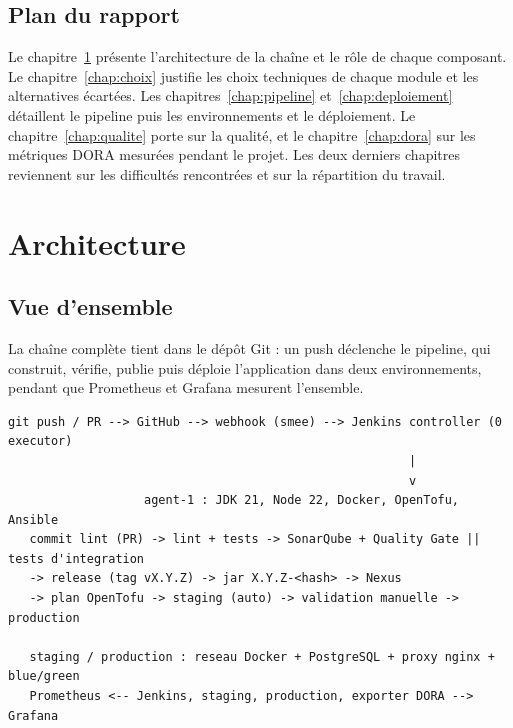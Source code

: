 \documentclass[11pt,a4paper]{report}
\begin{document}
\section*{Plan du rapport}
Le chapitre~\ref{chap:architecture} présente l'architecture de la chaîne et le rôle de chaque composant. Le chapitre~\ref{chap:choix} justifie les choix techniques de chaque module et les alternatives écartées. Les chapitres~\ref{chap:pipeline} et~\ref{chap:deploiement} détaillent le pipeline puis les environnements et le déploiement. Le chapitre~\ref{chap:qualite} porte sur la qualité, et le chapitre~\ref{chap:dora} sur les métriques DORA mesurées pendant le projet. Les deux derniers chapitres reviennent sur les difficultés rencontrées et sur la répartition du travail.

\chapter{Architecture}\label{chap:architecture}

\section{Vue d'ensemble}
La chaîne complète tient dans le dépôt Git : un push déclenche le pipeline, qui construit, vérifie, publie puis déploie l'application dans deux environnements, pendant que Prometheus et Grafana mesurent l'ensemble.

\begin{lstlisting}[caption={Architecture de la chaîne CI/CD}]
 git push / PR --> GitHub --> webhook (smee) --> Jenkins controller (0 executor)
                                                        |
                                                        v
                   agent-1 : JDK 21, Node 22, Docker, OpenTofu, Ansible
   commit lint (PR) -> lint + tests -> SonarQube + Quality Gate || tests d'integration
   -> release (tag vX.Y.Z) -> jar X.Y.Z-<hash> -> Nexus
   -> plan OpenTofu -> staging (auto) -> validation manuelle -> production

   staging / production : reseau Docker + PostgreSQL + proxy nginx + blue/green
   Prometheus <-- Jenkins, staging, production, exporter DORA --> Grafana
\end{lstlisting}

\end{document}
